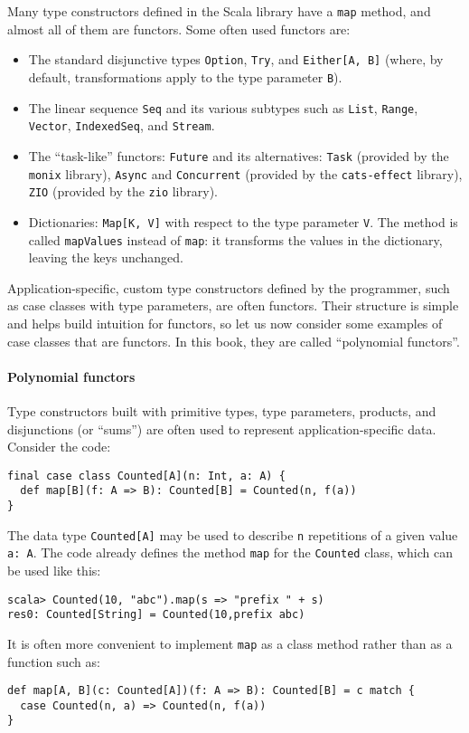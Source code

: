 Many type constructors defined in the Scala library have a \lstinline!map!
method, and almost all of them are functors. Some often used functors
are:
\begin{itemize}
\item The standard disjunctive types \lstinline!Option!, \lstinline!Try!,
and \lstinline!Either[A, B]! (where, by default, transformations
apply to the type parameter \lstinline!B!).
\item The linear sequence \lstinline!Seq! and its various subtypes such
as \lstinline!List!, \lstinline!Range!, \lstinline!Vector!, \lstinline!IndexedSeq!,
and \lstinline!Stream!.
\item The \textsf{``}task-like\textsf{''} functors: \lstinline!Future! and its alternatives:
\lstinline!Task! (provided by the \texttt{monix} library), \lstinline!Async!
and \lstinline!Concurrent! (provided by the \texttt{cats-effect}
library), \lstinline!ZIO! (provided by the \texttt{zio} library).
\item Dictionaries: \lstinline!Map[K, V]! with respect to the type parameter
\lstinline!V!. The method is called \lstinline!mapValues! instead
of \lstinline!map!: it transforms the values in the dictionary, leaving
the keys unchanged.
\end{itemize}
Application-specific, custom type constructors defined by the programmer,
such as case classes with type parameters, are often functors. Their
structure is simple and helps build intuition for functors, so let
us now consider some examples of case classes that are functors. In
this book, they are called \textsf{``}polynomial functors\textsf{''}.

\paragraph{Polynomial functors}

Type constructors built
with primitive types, type parameters, products, and disjunctions
(or \textsf{``}sums\textsf{''}) are often used to represent application-specific data.
Consider the code:
\begin{lstlisting}
final case class Counted[A](n: Int, a: A) {
  def map[B](f: A => B): Counted[B] = Counted(n, f(a))
}
\end{lstlisting}
The data type \lstinline!Counted[A]! may be used to describe \lstinline!n!
repetitions of a given value \lstinline!a: A!. The code already defines
the  method \lstinline!map! for the \lstinline!Counted! class, which
can be used like this:
\begin{lstlisting}
scala> Counted(10, "abc").map(s => "prefix " + s)
res0: Counted[String] = Counted(10,prefix abc) 
\end{lstlisting}
It is often more convenient to implement \lstinline!map! as a class
method rather than as a function such as:
\begin{lstlisting}
def map[A, B](c: Counted[A])(f: A => B): Counted[B] = c match {
  case Counted(n, a) => Counted(n, f(a))
}
\end{lstlisting}

